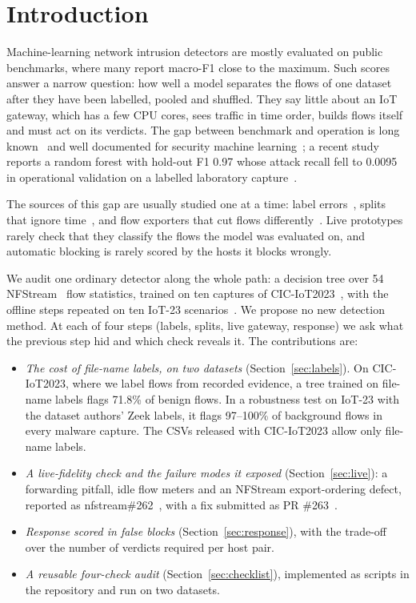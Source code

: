 \section{Introduction}\label{sec:intro}

Machine-learning network intrusion detectors are mostly evaluated on public benchmarks, where many report macro-F1 close to the maximum. Such scores answer a narrow question: how well a model separates the flows of one dataset after they have been labelled, pooled and shuffled. They say little about an IoT gateway, which has a few CPU cores, sees traffic in time order, builds flows itself and must act on its verdicts. The gap between benchmark and operation is long known~\cite{sommer2010outside} and well documented for security machine learning~\cite{arp2022dos,apruzzese2023sok}; a recent study reports a random forest with hold-out F1 0.97 whose attack recall fell to 0.0095 in operational validation on a labelled laboratory capture~\cite{tang2026hybrid}.

The sources of this gap are usually studied one at a time: label errors~\cite{engelen2021troubleshooting,liu2022error,flood2024smells}, splits that ignore time~\cite{pendlebury2019tesseract,arp2022dos}, and flow exporters that cut flows differently~\cite{pinto2025flowexporter,vitorino2025revisiting}. Live prototypes rarely check that they classify the flows the model was evaluated on, and automatic blocking is rarely scored by the hosts it blocks wrongly.

We audit one ordinary detector along the whole path: a decision tree over 54 NFStream~\cite{aouini2022nfstream} flow statistics, trained on ten captures of CIC-IoT2023~\cite{neto2023ciciot2023}, with the offline steps repeated on ten IoT-23 scenarios~\cite{garcia2020iot23}. We propose no new detection method. At each of four steps (labels, splits, live gateway, response) we ask what the previous step hid and which check reveals it. The contributions are:
\begin{itemize}
\item \emph{The cost of file-name labels, on two datasets} (Section~\ref{sec:labels}). On CIC-IoT2023, where we label flows from recorded evidence, a tree trained on file-name labels flags 71.8\% of benign flows. In a robustness test on IoT-23 with the dataset authors' Zeek labels, it flags 97--100\% of background flows in every malware capture. The CSVs released with CIC-IoT2023 allow only file-name labels.
\item \emph{A live-fidelity check and the failure modes it exposed} (Section~\ref{sec:live}): a forwarding pitfall, idle flow meters and an NFStream export-ordering defect, reported as nfstream\#262~\cite{nfstream262}, with a fix submitted as PR \#263~\cite{nfstream263}.
\item \emph{Response scored in false blocks} (Section~\ref{sec:response}), with the trade-off over the number of verdicts required per host pair.
\item \emph{A reusable four-check audit} (Section~\ref{sec:checklist}), implemented as scripts in the repository and run on two datasets.
\end{itemize}
